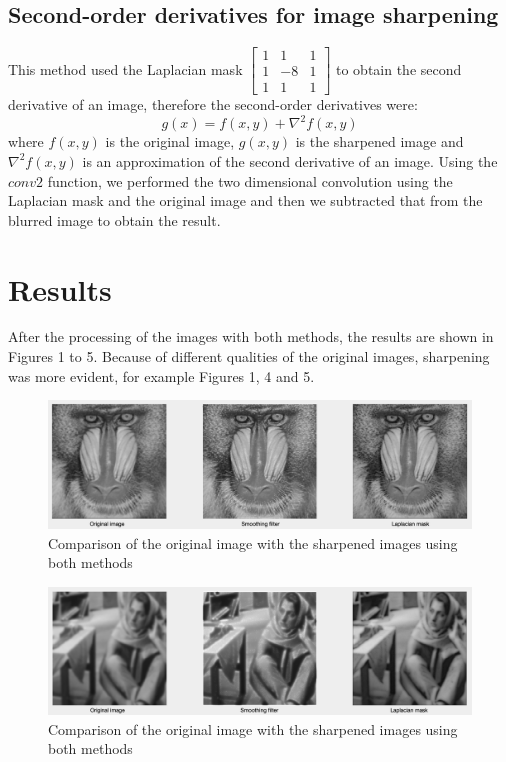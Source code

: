 \documentclass{article}
\begin{document}
\subsection{Second-order derivatives for image sharpening}
This method used the Laplacian mask $\begin{bmatrix} 
1 & 1 & 1\\ 
1 & -8 & 1\\ 
1 & 1 & 1  
\end{bmatrix}$ to obtain the second derivative of an image, therefore the second-order derivatives were: \begin{equation}
g(x) = f(x,y) + \nabla^2f(x,y)
\end{equation} \newline where $f(x,y)$ is the original image, $g(x,y)$ is the sharpened image and $\nabla^2f(x,y)$ is an approximation of the second derivative of an image. Using the $conv2$ \cite{con} function, we performed the two dimensional convolution using the Laplacian mask and the original image and then we subtracted that from the blurred image to obtain the result.
\section{Results}
After the processing of the images with both methods, the results are shown in Figures 1 to 5. Because of different qualities of the original images, sharpening was more evident, for example Figures 1, 4 and 5.
\begin{figure}[H]
\centering
\includegraphics[width=\linewidth]{i.png}
\caption{Comparison of the original image with the sharpened images using both methods}
\label{fig:badLes}
\end{figure}
\begin{figure}[H]
\centering
\includegraphics[width=\linewidth]{j.png}
\caption{Comparison of the original image with the sharpened images using both methods}
\label{fig:badLes}
\end{figure}
\end{document}
